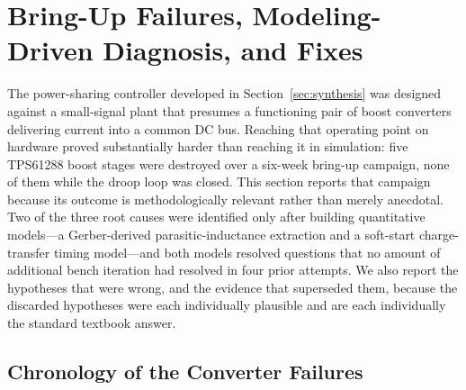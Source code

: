 
\section{Bring-Up Failures, Modeling-Driven Diagnosis, and Fixes}
\label{sec:bringup}


The power-sharing controller developed in Section~\ref{sec:synthesis} was designed
against a small-signal plant that presumes a functioning pair of boost converters
delivering current into a common DC bus. Reaching that operating point on hardware
proved substantially harder than reaching it in simulation: five TPS61288 boost
stages were destroyed over a six-week bring-up campaign, none of them while the
droop loop was closed. This section reports that campaign because its outcome is
methodologically relevant rather than merely anecdotal. Two of the three root
causes were identified only after building quantitative models---a Gerber-derived
parasitic-inductance extraction and a soft-start charge-transfer timing model---and
both models resolved questions that no amount of additional bench iteration had
resolved in four prior attempts. We also report the hypotheses that were wrong,
and the evidence that superseded them, because the discarded hypotheses were each
individually plausible and are each individually the standard textbook answer.

\subsection{Chronology of the Converter Failures}
\label{sec:bringup:chronology}

